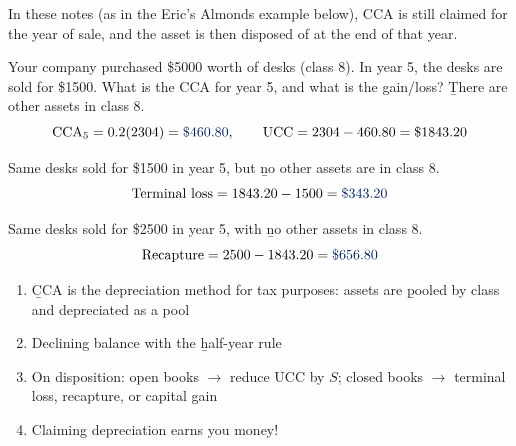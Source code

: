 \begin{remark}
    In these notes (as in the Eric's Almonds example below), CCA is still
    claimed for the year of sale, and the asset is then disposed of at the
    end of that year.
\end{remark}

\begin{example}
    Your company purchased \$5000 worth of desks (class 8). In year 5, the
    desks are sold for \$1500. What is the CCA for year 5, and what is the
    gain/loss? \b{There are other assets in class 8.}
    \\
    \[\text{CCA}_5 = 0.2(2304) = \db{\$460.80}, \qquad \text{UCC} = 2304 - 460.80 = \$1843.20\]
\end{example}

\begin{example}
    Same desks sold for \$1500 in year 5, but \b{no other assets are in
    class 8}.
    \\
    \[\text{Terminal loss} = 1843.20 - 1500 = \db{\$343.20}\]
\end{example}

\begin{example}
    Same desks sold for \$2500 in year 5, with \b{no other assets in class
    8}.
    \\
    \[\text{Recapture} = 2500 - 1843.20 = \db{\$656.80}\]
\end{example}

\begin{enumerate}
    \item \b{CCA} is the depreciation method for tax purposes: assets are \b{pooled} by class and depreciated as a pool
    \item Declining balance with the \b{half-year rule}
    \item On disposition: open books $\to$ reduce UCC by $S$; closed books $\to$ terminal loss, recapture, or capital gain
    \item Claiming depreciation earns you money!
\end{enumerate}

